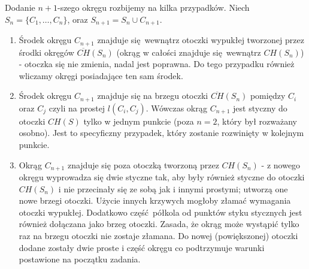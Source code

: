 \documentclass[a4paper,11pt]{article}
\theoremstyle{mytheor}
\begin{document}
Dodanie $n + 1$-szego okręgu rozbijemy na kilka przypadków. Niech $S_n = \{C_1,\ldots,C_{n}\}$, oraz $S_{n+1} = S_n \cup C_{n+1}$.
\begin{enumerate}
    \item Środek okręgu $C_{n+1}$ znajduje się wewnątrz otoczki wypukłej tworzonej przez środki okręgów $\overline{CH}(S_n)$ (okrąg w całości znajduje się wewnątrz $CH(S_n)$) - otoczka się nie zmienia, nadal jest poprawna. Do tego przypadku również wliczamy okręgi posiadające ten sam środek.
    \item Środek okręgu $C_{n+1}$ znajduje się na brzegu otoczki $\overline{CH}(S_n)$ pomiędzy $C_i$ oraz $C_j$ czyli na prostej $l(C_i, C_j)$. Wówczas okrąg $C_{n+1}$ jest styczny do otoczki $CH(S)$ tylko w jednym punkcie (poza $n = 2$, który był rozważany osobno). Jest to specyficzny przypadek, który zostanie rozwinięty w kolejnym punkcie. 
    \item Okrąg $C_{n+1}$ znajduje się poza otoczką tworzoną przez $CH(S_n)$ - z nowego okręgu wyprowadza się dwie styczne tak, aby były również styczne do otoczki $CH(S_n)$ i nie przecinały się ze sobą jak i innymi prostymi; utworzą one nowe brzegi otoczki. Użycie innych krzywych mogłoby złamać wymagania otoczki wypukłej. Dodatkowo część półkola od punktów styku stycznych jest również dołączana jako brzeg otoczki. Zasada, że okrąg może wystąpić tylko raz na brzegu otoczki nie zostaje złamana. Do nowej (powiększonej) otoczki dodane zostały dwie proste i część okręgu co podtrzymuje warunki postawione na początku zadania.
\end{enumerate}
\end{document}
